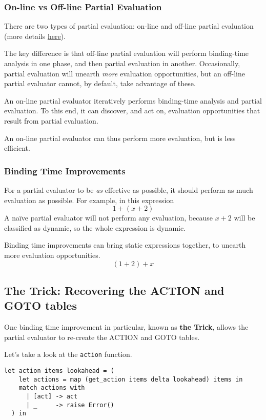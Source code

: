 \subsubsection{On-line vs Off-line Partial Evaluation}
There are two types of partial evaluation: on-line and off-line partial evaluation (more details \href{https://www.cambridge.org/core/journals/journal-of-functional-programming/article/online-and-offline-partial-evaluation-semantic-specifications-and-correctness-proofs/297804C171F96758B178B748358B9672}{here}). 

The key difference is that off-line partial evaluation will perform binding-time analysis in one phase, and then partial evaluation in another. Occasionally, partial evaluation will unearth \textit{more} evaluation opportunities, but an off-line partial evaluator cannot, by default, take advantage of these. 

An on-line partial evaluator iteratively performs binding-time analysis and partial evaluation. To this end, it can discover, and act on, evaluation opportunities that result from partial evaluation.

An on-line partial evaluator can thus perform more evaluation, but is less efficient.

\subsubsection{Binding Time Improvements}
For a partial evaluator to be \textit{as} effective as possible, it should perform as much evaluation as possible. For example, in this expression
\[1 + (x + 2)\]
A naïve partial evaluator will not perform any evaluation, because $x+2$ will be classified as dynamic, so the whole expression is dynamic. 

Binding time improvements can bring static expressions together, to unearth more evaluation opportunities.
\[(1+2) + x\]

\subsection{The Trick: Recovering the ACTION and GOTO tables}
One binding time improvement in particular, known as \textbf{the Trick}, allows the partial evaluator to re-create the ACTION and GOTO tables. 

Let's take a look at the \texttt{action} function.
\begin{verbatim}
let action items lookahead = (
    let actions = map (get_action items delta lookahead) items in
    match actions with
      | [act] -> act
      | _     -> raise Error()
  ) in
\end{verbatim}

